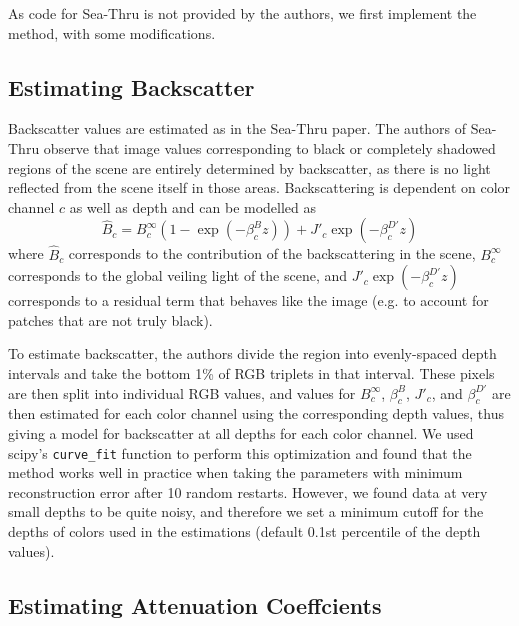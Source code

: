 \documentclass[10pt,twocolumn,letterpaper]{article}
\begin{document}
As code for Sea-Thru is not provided by the authors, we first implement the method, with
some modifications.

\subsection{Estimating Backscatter}
\label{sec:estbackscatter}

Backscatter values are estimated as in the Sea-Thru paper.
The authors of Sea-Thru observe that image values corresponding to black
or completely shadowed regions of the scene are entirely determined by
backscatter, as there is no light reflected from the scene itself in those
areas.
Backscattering is dependent on color channel $c$ as well as depth and can be modelled as
\begin{equation}
\label{eq:backscatter}
\hat{B}_c = B^\infty_c\left(1 - \exp(-\beta^B_c z)\right) + J'_c \exp(-\beta^{D'}_c z)
\end{equation}
where $\hat{B}_c$ corresponds to the contribution of the backscattering in the
scene, $B^\infty_c$ corresponds to the global veiling light of the scene, and
$J'_c \exp(-\beta^{D'}_c z)$ corresponds to a residual term that behaves like the
image (e.g. to account for patches that are not truly black).

To estimate backscatter, the authors divide the region into evenly-spaced depth
intervals and take the bottom 1\% of RGB triplets in that interval. These pixels
are then split into individual RGB values, and values for $B^\infty_c$, $\beta^B_c$,
$J'_c$, and $\beta^{D'}_c$ are then estimated for each color channel using the
corresponding depth values, thus giving a model for backscatter at all depths for
each color channel. We used scipy's \texttt{curve\_fit} function to perform this optimization
and found that the method works well in practice when taking the parameters with minimum reconstruction
error after 10 random restarts. However, we found data at very small depths
to be quite noisy, and therefore we set a minimum cutoff for the depths of colors used in
the estimations (default 0.1st percentile of the depth values).

\subsection{Estimating Attenuation Coeffcients}
\end{document}
